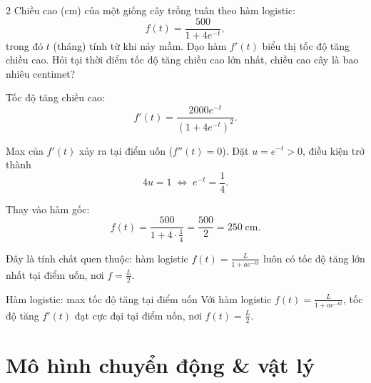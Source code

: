 \separator

\begin{baitoan}{2 \hfill {}}
Chiều cao (cm) của một giống cây trồng tuân theo hàm logistic:
\[ f(t) = \frac{500}{1 + 4e^{-t}}, \]
trong đó $t$ (tháng) tính từ khi nảy mầm. Đạo hàm $f'(t)$ biểu thị tốc độ tăng chiều cao. Hỏi tại thời điểm tốc độ tăng chiều cao lớn nhất, chiều cao cây là bao nhiêu centimet?
\end{baitoan}

\begin{loigiai}
Tốc độ tăng chiều cao:
\[ f'(t) = \frac{2000e^{-t}}{(1 + 4e^{-t})^2}. \]

Max của $f'(t)$ xảy ra tại điểm uốn ($f''(t) = 0$). Đặt $u = e^{-t} > 0$, điều kiện trở thành
\[ 4u = 1 \;\Leftrightarrow\; e^{-t} = \frac{1}{4}. \]

Thay vào hàm gốc:
\[ f(t) = \frac{500}{1 + 4 \cdot \frac{1}{4}} = \frac{500}{2} = \boxed{250\;\text{cm}}. \]

Đây là tính chất quen thuộc: hàm logistic $f(t) = \frac{L}{1 + ae^{-kt}}$ luôn có tốc độ tăng lớn nhất tại điểm uốn, nơi $f = \frac{L}{2}$.
\end{loigiai}

\begin{meobotui}{Hàm logistic: max tốc độ tăng tại điểm uốn}
Với hàm logistic $f(t) = \frac{L}{1 + ae^{-kt}}$, tốc độ tăng $f'(t)$ đạt cực đại tại điểm uốn, nơi $f(t) = \frac{L}{2}$.
\end{meobotui}

\separator

\section{Mô hình chuyển động \& vật lý}

